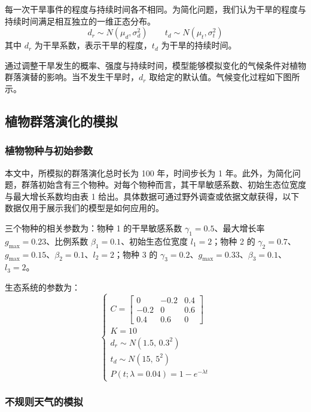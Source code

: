 \documentclass[11pt,a4paper]{ctexart}
\begin{document}
每一次干旱事件的程度与持续时间各不相同。为简化问题，我们认为干旱的程度与持续时间满足相互独立的一维正态分布。
\begin{equation}
d_r\sim N\left(\mu_d,\sigma_d^2\right)\qquad t_d\sim N\left(\mu_t,\sigma_t^2\right)
\end{equation}
其中 $d_r$ 为干旱系数，表示干旱的程度，$t_d$ 为干旱的持续时间。

通过调整干旱发生的概率、强度与持续时间，模型能够模拟变化的气候条件对植物群落演替的影响。当不发生干旱时，$d_r$ 取给定的默认值。气候变化过程如下图所示。
\subsection{植物群落演化的模拟}

\subsubsection{植物物种与初始参数}

本文中，所模拟的群落演化总时长为 100 年，时间步长为 1 年。此外，为简化问题，群落初始含有三个物种。对每个物种而言，其干旱敏感系数、初始生态位宽度与最大增长系数均由表 1 给出。具体数据可通过野外调查或依据文献获得，以下数据仅用于展示我们的模型是如何应用的。

三个物种的相关参数为：物种 1 的干旱敏感系数 $\gamma_1=0.5$、最大增长率 $g_{\max}=0.23$、比例系数 $\beta_1=0.1$、初始生态位宽度 $l_1=2$；物种 2 的 $\gamma_2=0.7$、$g_{\max}=0.15$、$\beta_2=0.1$、$l_2=2$；物种 3 的 $\gamma_3=0.2$、$g_{\max}=0.33$、$\beta_3=0.1$、$l_3=2$。

生态系统的参数为：
\begin{equation}
\begin{cases}
C=\begin{bmatrix}
0 & -0.2 & 0.4\\
-0.2 & 0 & 0.6\\
0.4 & 0.6 & 0
\end{bmatrix}\\[1.0em]
K=10\\[0.3em]
d_r\sim N(1.5,\,0.3^2)\\[0.3em]
t_d\sim N(15,\,5^2)\\[0.3em]
P(t;\lambda=0.04)=1-e^{-\lambda t}
\end{cases}
\end{equation}

\subsubsection{不规则天气的模拟}
\end{document}
